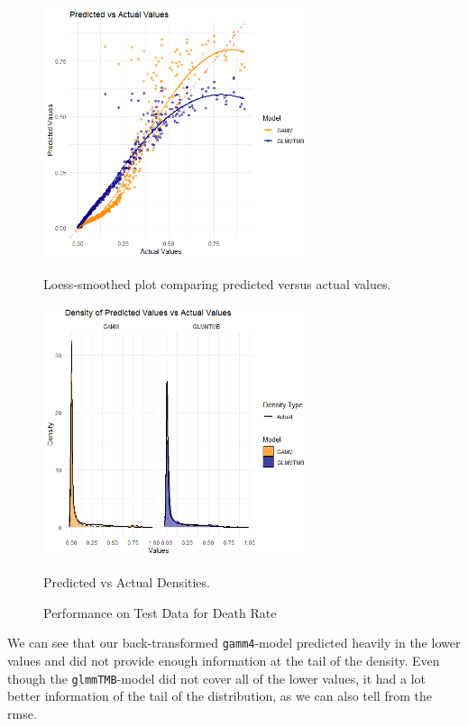 \documentclass[12pt, twoside,hidelinks]{article}
\theoremstyle{definition}
\numberwithin{equation}{section}
\begin{document}
\begin{figure}[H]
\centering

\includegraphics[width=0.7\textwidth]{visuals/mortalityData/predvactRATE.png}
\caption*{Loess-smoothed plot comparing predicted versus actual values.}
\label{fig:hist_pred_errors}

\includegraphics[width=0.7\textwidth]{visuals/mortalityData/denspredvactRATE.png}
\caption*{Predicted vs Actual Densities.}
\label{fig:predicted_vs_actual_densities}

\caption{Performance on Test Data for Death Rate}
\label{fig:test_data_performance_4}
\end{figure}

We can see that our back-transformed \texttt{gamm4}-model predicted heavily in the lower values and did not provide enough information at the tail of the density. Even though the \texttt{glmmTMB}-model did not cover all of the lower values, it had a lot better information of the tail of the distribution, as we can also tell from the rmse.
\end{document}
